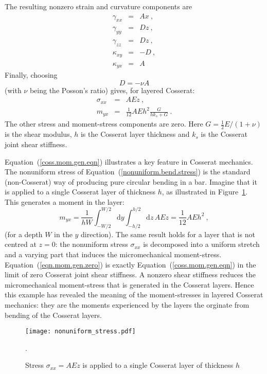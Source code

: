\documentclass[]{scrreprt}
\begin{document}
The resulting nonzero strain and curvature components are
\begin{eqnarray}
\gamma_{xx} & = & Ax \ , \\
\gamma_{yy} & = & Dz \ , \\
\gamma_{zz} & = & Dz \ , \\
\kappa_{xy} & = & -D \ , \\
\kappa_{yx} & = & A
\end{eqnarray}
Finally, choosing
\begin{equation}
D = -\nu A
\end{equation}
(with $\nu$ being the Posson's ratio) gives, for layered Cosserat:
\begin{eqnarray}
\sigma_{xx} & = & AEz
\label{nonuniform.bend.stress} \ , \\
m_{yx} & = & \mbox{$\frac{1}{12}$}AEh^{2} \frac{G}{hk_{s} + G} \ .
\label{coss.mom.gen.eqn}
\end{eqnarray}
The other stress and moment-stress components are zero.  Here $G =
\frac{1}{2}E/(1+\nu)$ is the shear modulus, $h$ is the Cosserat layer
thickness and $k_{s}$ is the Cosserat joint shear stiffness.

Equation~(\ref{coss.mom.gen.eqn}) illustrates a key feature in Cosserat
mechanics.  The nonuniform stress of
Equation~(\ref{nonuniform.bend.stress}) is the standard (non-Cosserat)
way of producing pure circular bending in a bar.  Imagine that it is
applied to a single Cosserat layer of thickness $h$, as illustrated in
Figure~\ref{nonuniform_stress.fig}.  This generates a moment in the layer:
\begin{equation}
m_{yx} =
\frac{1}{hW}\int_{-W/2}^{W/2}\mathrm{d}y\int_{-h/2}^{h/2}\mathrm{d}z\,
AEz = \mbox{$\frac{1}{12}$}AEh^{2} \ ,
\label{eqn.mom.gen.zero}
\end{equation}
(for a depth $W$ in the $y$ direction).  The same result holds for a
layer that is not centred at $z=0$: the nonuniform stress
$\sigma_{xx}$ is decomposed into a uniform stretch and a varying part
that induces the micromechanical moment-stress.
Equation~(\ref{eqn.mom.gen.zero}) is exactly
Equation~(\ref{coss.mom.gen.eqn}) in the limit of zero Cosserat joint
shear stiffness.  A nonzero shear stiffness reduces the
micromechanical moment-stress that is generated in the Cosserat
layers.  Hence this example has revealed the meaning of the
moment-stresses in layered Cosserat mechanics: they are the moments
experienced by the layers the orginate from bending of the Cosserat layers.

\begin{figure}[htb]
\begin{center}
\texttt{[image: nonuniform\_stress.pdf]}
\caption{Stress $\sigma_{xx}=AEz$ is applied to a single Cosserat
  layer of thickness $h$}.
\label{nonuniform_stress.fig}
\end{center}
\end{figure}
\end{document}
